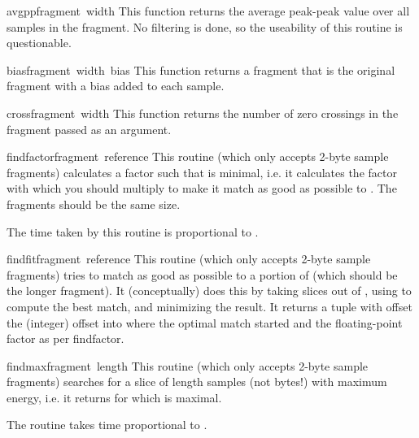 \begin{funcdesc}{avgpp}{fragment\, width}
This function returns the average peak-peak value over all samples in
the fragment. No filtering is done, so the useability of this routine
is questionable.
\end{funcdesc}

\begin{funcdesc}{bias}{fragment\, width\, bias}
This function returns a fragment that is the original fragment with a
bias added to each sample.
\end{funcdesc}

\begin{funcdesc}{cross}{fragment\, width}
This function returns the number of zero crossings in the fragment
passed as an argument.
\end{funcdesc}

\begin{funcdesc}{findfactor}{fragment\, reference}
This routine (which only accepts 2-byte sample fragments) calculates a
factor  such that 
is minimal, i.e. it calculates the factor with which you should
multiply  to make it match as good as possible to
. The fragments should be the same size.

The time taken by this routine is proportional to . 
\end{funcdesc}

\begin{funcdesc}{findfit}{fragment\, reference}
This routine (which only accepts 2-byte sample fragments) tries to
match  as good as possible to a portion of
 (which should be the longer fragment). It
(conceptually) does this by taking slices out of , using
 to compute the best match, and minimizing the
result.
It returns a tuple  with offset the
(integer) offset into  where the optimal match started
and  the floating-point factor as per findfactor.
\end{funcdesc}

\begin{funcdesc}{findmax}{fragment\, length}
This routine (which only accepts 2-byte sample fragments) searches
 for a slice of length  samples (not bytes!)
with maximum energy, i.e. it returns  for which
 is maximal.

The routine takes time proportional to .
\end{funcdesc}

